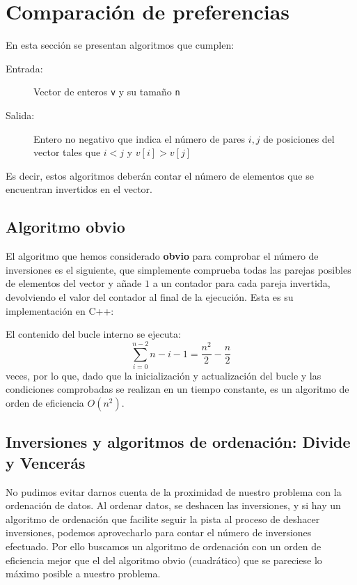 \section{Comparación de preferencias}

En esta sección se presentan algoritmos que cumplen:
\begin{description}
	\item[Entrada:] Vector de enteros \texttt{v} y su tamaño \texttt{n}
	\item[Salida:] Entero no negativo que indica el número de pares $i,j$ de posiciones del vector tales que $i < j$ y $v[i] > v[j]$
\end{description}

Es decir, estos algoritmos deberán contar el número de elementos que se encuentran invertidos en el vector.

\subsection{Algoritmo obvio}

El algoritmo que hemos considerado \textbf{obvio} para comprobar el número de inversiones es el siguiente, que simplemente comprueba todas las parejas posibles de elementos del vector y añade $1$ a un contador para cada pareja invertida, devolviendo el valor del contador al final de la ejecución. Esta es su implementación en C++:



El contenido del bucle interno se ejecuta:
\[\sum_{i=0}^{n-2} n-i-1 = \frac{n^2}{2}-\frac{n}{2}\]
veces, por lo que, dado que la inicialización y actualización del bucle y las condiciones comprobadas se realizan en un tiempo constante, es un algoritmo de orden de eficiencia $O(n^2)$.

\subsection{Inversiones y algoritmos de ordenación: Divide y Vencerás}

No pudimos evitar darnos cuenta de la proximidad de nuestro problema con la ordenación de datos. Al ordenar datos, se deshacen las inversiones, y si hay un algoritmo de ordenación que facilite seguir la pista al proceso de deshacer inversiones, podemos aprovecharlo para contar el número de inversiones efectuado.
Por ello buscamos un algoritmo de ordenación con un orden de eficiencia mejor que el del algoritmo obvio (cuadrático) que se pareciese lo máximo posible a nuestro problema. \\

